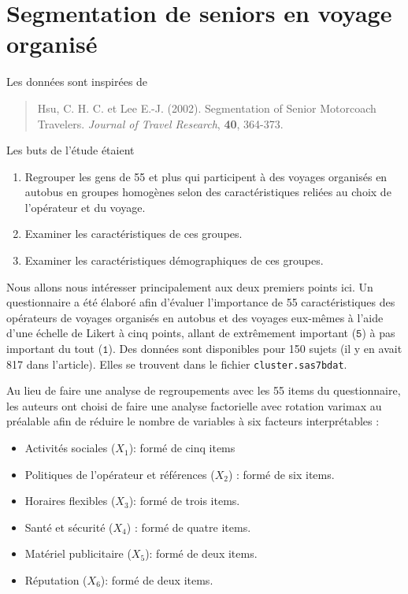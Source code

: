 \documentclass[
  11pt,
  letterpaper,
]{book}
\providecommand{\tightlist}{%
  \setlength{\itemsep}{0pt}\setlength{\parskip}{0pt}}
\theoremstyle{definition}
\theoremstyle{definition}
\theoremstyle{definition}
\theoremstyle{definition}
\theoremstyle{remark}
\begin{document}
\hypertarget{segmentation-de-seniors-en-voyage-organisuxe9}{%
\section{Segmentation de seniors en voyage organisé}\label{segmentation-de-seniors-en-voyage-organisuxe9}}

Les données sont inspirées de

\begin{quote}
Hsu, C. H. C. et Lee E.-J. (2002). Segmentation of Senior Motorcoach Travelers. \emph{Journal of Travel Research}, \textbf{40}, 364-373.
\end{quote}

Les buts de l'étude étaient

\begin{enumerate}
\def\labelenumi{\arabic{enumi})}
\tightlist
\item
  Regrouper les gens de 55 et plus qui participent à des voyages organisés en autobus en groupes homogènes selon des caractéristiques reliées au choix de l'opérateur et du voyage.
\item
  Examiner les caractéristiques de ces groupes.
\item
  Examiner les caractéristiques démographiques de ces groupes.
\end{enumerate}

Nous allons nous intéresser principalement aux deux premiers points ici. Un questionnaire a été élaboré afin d'évaluer l'importance de 55 caractéristiques des opérateurs de voyages organisés en autobus et des voyages eux-mêmes à l'aide d'une échelle de Likert à cinq points, allant de extrêmement important (\(\texttt{5}\)) à pas important du tout (\(\texttt{1}\)). Des données sont disponibles pour 150 sujets (il y en avait 817 dans l'article). Elles se trouvent dans le fichier \texttt{cluster.sas7bdat}.

Au lieu de faire une analyse de regroupements avec les 55 items du questionnaire, les auteurs ont choisi de faire une analyse factorielle avec rotation varimax au préalable afin de réduire le nombre de variables à six facteurs interprétables :

\begin{itemize}
\tightlist
\item
  Activités sociales (\(X_1\)): formé de cinq items
\item
  Politiques de l'opérateur et références (\(X_2\)) : formé de six items.
\item
  Horaires flexibles (\(X_3\)): formé de trois items.
\item
  Santé et sécurité (\(X_4\)) : formé de quatre items.
\item
  Matériel publicitaire (\(X_5\)): formé de deux items.
\item
  Réputation (\(X_6\)): formé de deux items.
\end{itemize}
\end{document}
